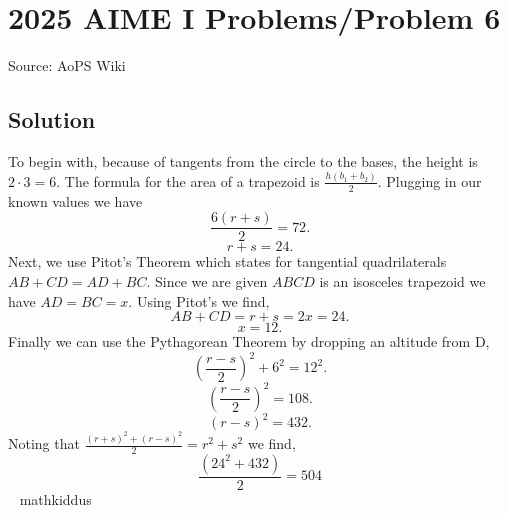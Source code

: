 \documentclass[12pt]{article}
\begin{document}
\section*{{2025 AIME I Problems/Problem 6}}
Source: AoPS Wiki

\subsection*{Solution}
To begin with, because of tangents from the circle to the bases, the height is $2\cdot3=6.$ The formula for the area of a trapezoid is $\frac{h(b_1+b_2)}{2}.$ Plugging in our known values we have \[\frac{6(r+s)}{2}=72.\] \[r+s=24.\] Next, we use Pitot's Theorem which states for tangential quadrilaterals $AB+CD=AD+BC.$ Since we are given $ABCD$ is an isosceles trapezoid we have $AD=BC=x.$ Using Pitot's we find, \[AB+CD=r+s=2x=24.\] \[x=12.\] Finally we can use the Pythagorean Theorem by dropping an altitude from D, \[\left(\frac{r - s}{2}\right)^2 + 6^2 = 12^2.\] \[\left(\frac{r-s}{2}\right)^2=108.\] \[(r-s)^2=432.\] Noting that $\frac{(r + s)^2 + (r - s)^2}{2} = r^2 + s^2$ we find, \[\frac{(24^2+432)}{2}=\boxed{504}\] ~ mathkiddus
\end{document}
